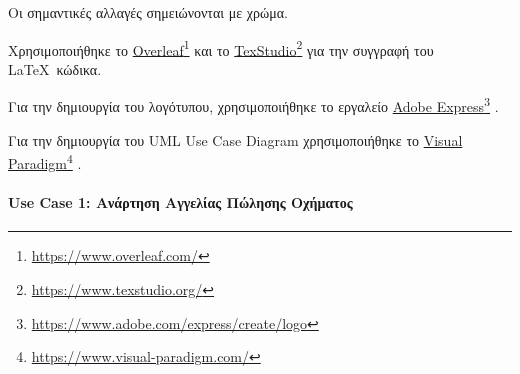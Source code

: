 \documentclass{../ol-softwaremanual}
\newcommand{\doclink}[2]{\href{#1}{#2}\footnote{\url{#1}}}
\begin{document}
	Οι σημαντικές αλλαγές σημειώνονται με  χρώμα.
	
	
	
	
	\vspace{20pt}
	
	\vspace{20pt}
	\flushleft
	Χρησιμοποιήθηκε το \en \doclink{https://www.overleaf.com/}{Overleaf} \gr και το \en \doclink{https://www.texstudio.org/}{TexStudio} \gr για την συγγραφή του \LaTeX\ κώδικα. \break
	
	Για την δημιουργία του λογότυπου, χρησιμοποιήθηκε το εργαλείο \en \doclink{https://www.adobe.com/express/create/logo}{Adobe Express} . \gr \break
	
	Για την δημιουργία του \en UML Use Case Diagram \gr χρησιμοποιήθηκε το \en \doclink{https://www.visual-paradigm.com/}{Visual Paradigm} . \gr \break 
	
	\newpage
	
	
	\paragraph{\en Use Case 1: \gr Ανάρτηση Αγγελίας Πώλησης Οχήματος}
	
\end{document}
